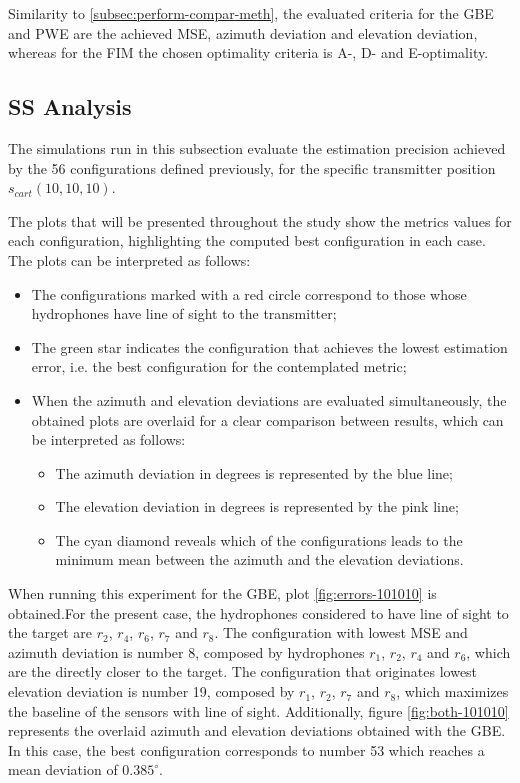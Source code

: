 Similarity to \ref{subsec:perform-compar-meth}, the evaluated criteria for the GBE and PWE are the achieved MSE, azimuth deviation and elevation deviation, whereas for the FIM the chosen optimality criteria is A-, D- and E-optimality. 

\subsection{SS Analysis}

The simulations run in this subsection evaluate the estimation precision achieved by the 56 configurations defined previously, for the specific transmitter position $s_{cart}(10,10,10)$. 

The plots that will be presented throughout the study show the metrics values for each configuration, highlighting the computed best configuration in each case. The plots can be interpreted as follows: 

\begin{itemize}
	\item The configurations marked with a red circle correspond to those whose hydrophones have line of sight to the transmitter;
	
	\item The green star indicates the configuration that achieves the lowest estimation error, i.e. the best configuration for the contemplated metric;
	
	\item When the azimuth and elevation deviations are evaluated simultaneously, the obtained plots are overlaid for a clear comparison between results, which can be interpreted as follows:
	
	\begin{itemize}
		\item The azimuth deviation in degrees is represented by the blue line;
		\item  The elevation deviation in degrees is represented by the pink line;
		\item The cyan diamond reveals which of the configurations leads to the minimum mean between the azimuth and the elevation deviations.
	\end{itemize}
	
\end{itemize}

When running this experiment for the GBE, plot \ref{fig:errors-101010} is obtained.For the present case, the hydrophones considered to have line of sight to the target are $r_2$, $r_4$, $r_6$, $r_7$ and $r_8$. The configuration with lowest MSE and azimuth deviation is number 8, composed by hydrophones $r_1$, $r_2$, $r_4$ and $r_6$, which are the directly closer to the target. The configuration that originates lowest elevation deviation is number 19, composed by $r_1$, $r_2$, $r_7$ and $r_8$, which maximizes the baseline of the sensors with line of sight. Additionally, figure \ref{fig:both-101010} represents the overlaid azimuth and elevation deviations obtained with the GBE. In this case, the best configuration corresponds to number 53 which reaches a mean deviation of $0.385^{\circ}$. 

